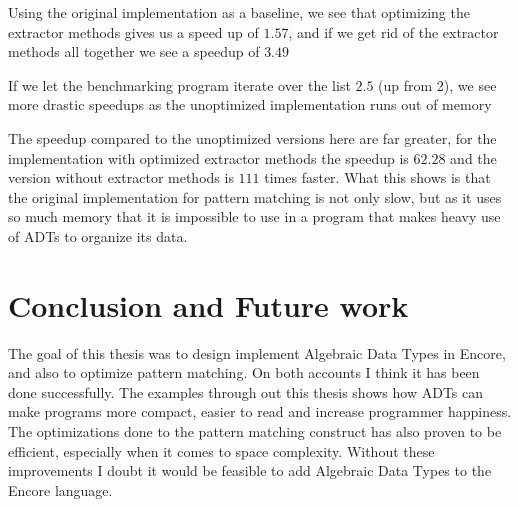 \documentclass[10pt]{report}
\begin{document}
\par{Using the original implementation as a baseline, we see that optimizing the extractor methods gives us a speed up of $1.57$, and if we get rid of the extractor methods all together we see a speedup of $3.49$}
\par{If we let the benchmarking program iterate over the list $2.5$ (up from 2), we see more drastic speedups as the unoptimized implementation runs out of memory}

\par{The speedup compared to the unoptimized versions here are far greater, for the implementation with optimized extractor methods the speedup is $62.28$ and the version without extractor methods is $111$ times faster. What this shows is that the original implementation for pattern matching is not only slow, but as it uses so much memory that it is impossible to use in a program that makes heavy use of ADTs to organize its data.}

\chapter{Conclusion and Future work}
\par{The goal of this thesis was to design implement Algebraic Data Types in Encore, and also to optimize pattern matching. On both accounts I think it has been done successfully. The examples through out this thesis shows how ADTs can make programs more compact, easier to read and increase programmer happiness\cite{happy}. The optimizations done to the pattern matching construct has also proven to be efficient, especially when it comes to space complexity. Without these improvements I doubt it would be feasible to add Algebraic Data Types to the Encore language.}
\end{document}
